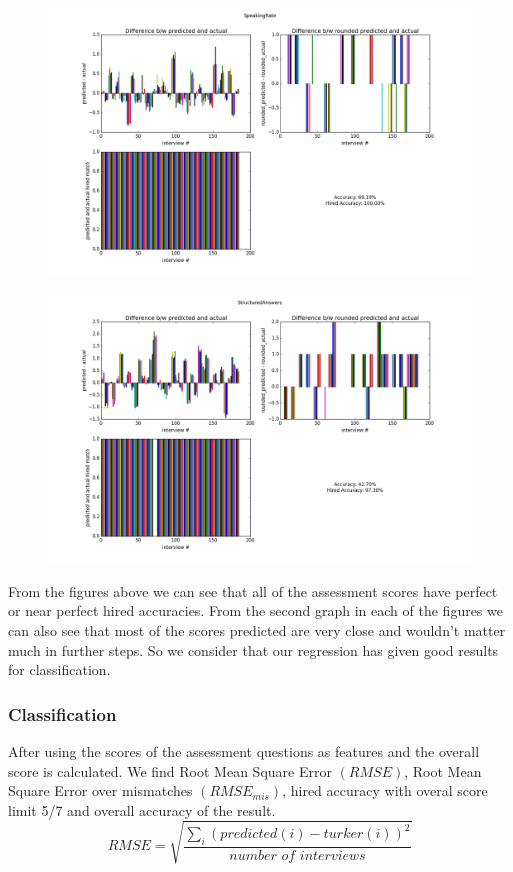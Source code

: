 \documentclass[11pt]{article}
\begin{document}
\begin{figure}[H]
\begin{center}
\includegraphics[width=1\columnwidth]{figures2/SpeakingRate.png}
\end{center}
\end{figure}

\begin{figure}[H]
\begin{center}
\includegraphics[width=1\columnwidth]{figures2/StructuredAnswers.png}
\end{center}
\end{figure}

From the figures above we can see that all of the assessment scores have perfect or near perfect hired accuracies. From the second graph in each of the figures we can also see that most of the scores predicted are very close and wouldn't matter much in further steps. So we consider that our regression has given good results for classification.
\subsubsection{Classification}
After using the scores of the assessment questions as features and the overall score is calculated. We find Root Mean Square Error $(RMSE)$, Root Mean Square Error over mismatches $(RMSE_{mis})$, hired accuracy with overal score limit 5/7 and overall accuracy of the result.
\begin{equation}
 RMSE = \sqrt{\frac{\sum_{i}(predicted(i)-turker(i))^2}{\textit{number of interviews}}}
\end{equation}
\end{document}
